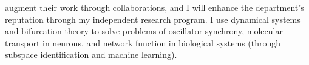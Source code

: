 augment their work through collaborations, and I will enhance the department's reputation through my independent research program. I use dynamical systems and bifurcation theory to solve problems of oscillator synchrony, molecular transport in neurons, and network function in biological systems (through subspace identification and machine learning).